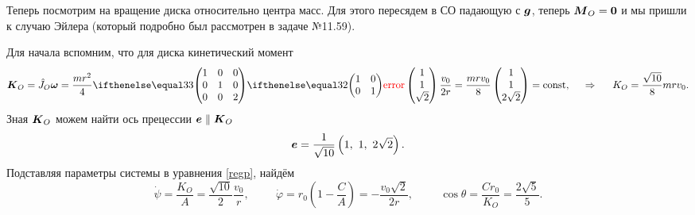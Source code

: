 Теперь посмотрим на вращение диска относительно центра масс. Для этого пересядем в СО падающую с $\mbox{\boldmath $g$}$, теперь $\mbox{\boldmath $M$}_O = \mbox{\boldmath $0$}$ и мы пришли к случаю Эйлера (который подробно был рассмотрен в задаче №11.59).

Для начала вспомним, что для диска кинетический момент
\begin{equation*}
    \vc{K}_O = \hat{J}_O \vc{\omega} = 
    \frac{m r^2}{4} \dmat{3}{1}{1}{2} 
    \begin{pmatrix}
        1 \\ 1  \\ \sqrt{2} 
    \end{pmatrix}
    \frac{v_0}{2r}  = \frac{mrv_0}{8} \begin{pmatrix}
        1 \\ 1 \\ 2 \sqrt{2}
    \end{pmatrix} = \const,
    \hspace{0.5cm} \Rightarrow \hspace{0.5cm} 
    K_O = \frac{\sqrt{10}}{8} mrv_0.
\end{equation*}
Зная $\mbox{\boldmath $K$}_O$ можем найти ось прецессии $\mbox{\boldmath $e$} \parallel \mbox{\boldmath $K$}_O$
\begin{equation*}
    \mbox{\boldmath $e$} = \frac{1}{\sqrt{10}} \left(1, \ 1, \ 2 \sqrt{2}\right).
\end{equation*}
Подставляя параметры системы в уравнения \eqref{regp}, найдём
\begin{equation*}
    \dot{\psi} = \frac{K_O}{A} = \frac{\sqrt{10}}{2} \frac{v_0}{r} ,
    \hspace{1cm} 
    \dot{\varphi} = r_0 \left(1 - \frac{C}{A} \right) =  
    -\frac{v_0 \sqrt{2}}{2r},
    \hspace{1cm} 
    \cos \theta = \frac{Cr_0}{K_O} = \frac{2\sqrt{5}}{5}.
\end{equation*}

